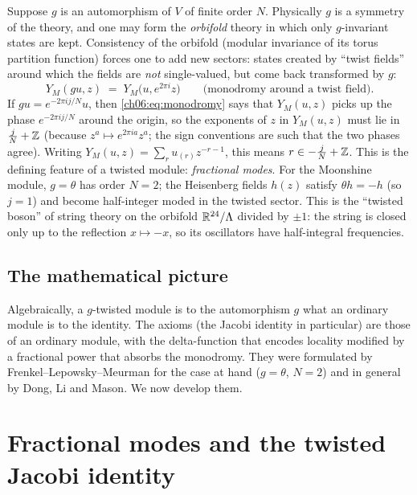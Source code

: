 Suppose $g$ is an automorphism of $V$ of finite order $N$.  Physically $g$ is a symmetry of the
theory, and one may form the \emph{orbifold} theory in which only $g$-invariant states are kept.
Consistency of the orbifold (modular invariance of its torus partition function) forces one to
add new sectors: states created by ``twist fields'' around which the fields are \emph{not}
single-valued, but come back transformed by $g$:
\begin{equation}\label{ch06:eq:monodromy}
  Y_M(g u, z) \;=\; Y_M\bigl(u, e^{2\pi i} z\bigr)\qquad\text{(monodromy around a twist field).}
\end{equation}
If $g u = e^{-2\pi i j/N}u$, then \eqref{ch06:eq:monodromy} says that $Y_M(u,z)$ picks up the
phase $e^{-2\pi i j/N}$ around the origin, so the exponents of $z$ in $Y_M(u,z)$ must lie in
$\tfrac{j}{N}+{\mathbb{Z}}$ (because $z^{a}\mapsto e^{2\pi i a}z^a$; the sign conventions are such that the
two phases agree).  Writing $Y_M(u,z)=\sum_r u_{(r)}z^{-r-1}$, this means $r\in -\tfrac jN+{\mathbb{Z}}$.
This is the defining feature of a twisted module: \emph{fractional modes}.  For the Moonshine
module, $g=\theta$ has order $N=2$; the Heisenberg fields $h(z)$ satisfy $\theta h=-h$ (so $j=1$)
and become half-integer moded in the twisted sector.  This is the ``twisted boson'' of string
theory on the orbifold $\mathbb R^{24}/{\Lambda}$ divided by $\pm1$: the string is closed only up to
the reflection $x\mapsto -x$, so its oscillators have half-integral frequencies.

\subsection{The mathematical picture}

Algebraically, a $g$-twisted module is to the automorphism $g$ what an ordinary module is to the
identity.  The axioms (the Jacobi identity in particular) are those of an ordinary module, with the
delta-function that encodes locality modified by a fractional power that absorbs the monodromy.
They were formulated by Frenkel--Lepowsky--Meurman for the case at hand ($g=\theta$, $N=2$) and in
general by Dong, Li and Mason.  We now develop them.

\section{Fractional modes and the twisted Jacobi identity}\label{ch06:sec:dlm}

